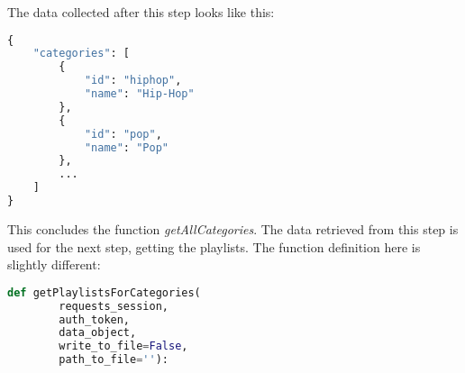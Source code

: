 %
%
%

The data collected after this step looks like this:

\begin{lstlisting}[language=Python]
{
    "categories": [
        {
            "id": "hiphop",
            "name": "Hip-Hop"
        },
        {
            "id": "pop",
            "name": "Pop"
        },
        ...
    ]
}
\end{lstlisting}

This concludes the function \emph{getAllCategories}.
The data retrieved from this step is used for the next step, getting the playlists.
The function definition here is slightly different:

\begin{lstlisting}[language=Python]
    def getPlaylistsForCategories(
        requests_session,
        auth_token,
        data_object,
        write_to_file=False,
        path_to_file=''):
\end{lstlisting}

